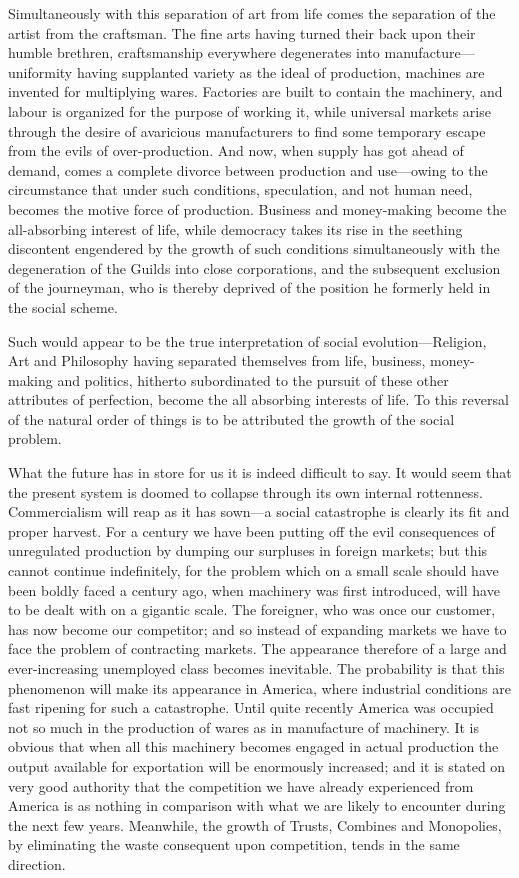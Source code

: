 \documentclass{book}
\begin{document}
Simultaneously with this separation of art from life comes the separation of the artist from the craftsman. The fine arts having turned their back upon their humble brethren, craftsmanship everywhere degenerates into manufacture—uniformity having supplanted variety as the ideal of production, machines are invented for multiplying wares. Factories are built to contain the machinery, and labour is organized for the purpose of working it, while universal markets arise through the desire of avaricious manufacturers to find some temporary escape from the evils of over-production. And now, when supply has got ahead of demand, comes a complete divorce between production and use—owing to the circumstance that under such conditions, speculation, and not human need, becomes the motive force of production. Business and money-making become the all-absorbing interest of life, while democracy takes its rise in the seething discontent engendered by the growth of such conditions simultaneously with the degeneration of the Guilds into close corporations, and the subsequent exclusion of the journeyman, who is thereby deprived of the position he formerly held in the social scheme.

Such would appear to be the true interpretation of social evolution—Religion, Art and Philosophy having separated themselves from life, business, money-making and politics, hitherto subordinated to the pursuit of these other attributes of perfection, become the all absorbing interests of life. To this reversal of the natural order of things is to be attributed the growth of the social problem.

What the future has in store for us it is indeed difficult to say. It would seem that the present system is doomed to collapse through its own internal rottenness. Commercialism will reap as it has sown—a social catastrophe is clearly its fit and proper harvest. For a century we have been putting off the evil consequences of unregulated production by dumping our surpluses in foreign markets; but this cannot continue indefinitely, for the problem which on a small scale should have been boldly faced a century ago, when machinery was first introduced, will have to be dealt with on a gigantic scale. The foreigner, who was once our customer, has now become our competitor; and so instead of expanding markets we have to face the problem of contracting markets. The appearance therefore of a large and ever-increasing unemployed class becomes inevitable. The probability is that this phenomenon will make its appearance in America, where industrial conditions are fast ripening for such a catastrophe. Until quite recently America was occupied not so much in the production of wares as in manufacture of machinery. It is obvious that when all this machinery becomes engaged in actual production the output available for exportation will be enormously increased; and it is stated on very good authority that the competition we have already experienced from America is as nothing in comparison with what we are likely to encounter during the next few years. Meanwhile, the growth of Trusts, Combines and Monopolies, by eliminating the waste consequent upon competition, tends in the same direction.
\end{document}
